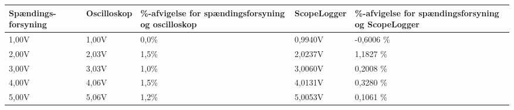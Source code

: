 \begin{center}
\label{USBisolatortest}
    \begin{tabular}{ | p{2cm} | p{2cm} | p{3.5cm} | p{2.1cm} | p{3.5cm} |}
    \hline
    \textbf{Spændings- forsyning} 	&  \textbf{Oscilloskop} 	& \textbf{\%-afvigelse for spændingsforsyning og oscilloskop}	& \textbf{ScopeLogger}	&\textbf{\%-afvigelse for spændingsforsyning og ScopeLogger} \\ \hline
    1,00V             				& 1,00V    				& 0,0\% 		    	& 0,9940V       &  -0,6006 \%  \\ \hline
    2,00V                          	& 2,03V					& 1,5\%			& 2,0237V       &   1,1827 \%  \\ \hline
    3,00V                         	& 3,03V					& 1,0\%	    		& 3,0060V       &   0,2008 \%   \\ \hline
    4,00V                          	& 4,06V					& 1,5\%			& 4,0131V       &   0,3280 \%   \\ \hline
    5,00V                          	& 5,06V					& 1,2\% 		& 5,0053V       &   0,1061 \%  \\ \hline
    \end{tabular}
\end{center}
